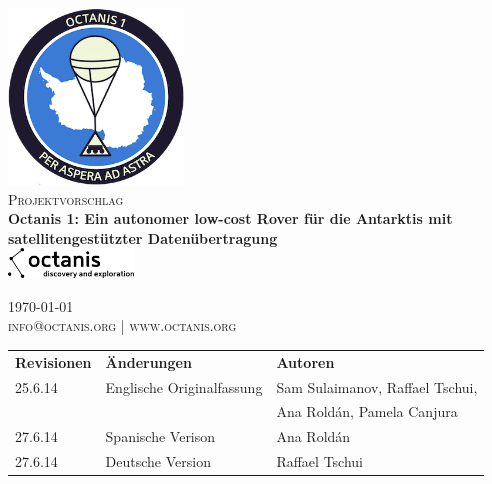 \documentclass[a4paper,12pt]{article}
\begin{document}
\begin{titlepage}
\begin{center}

\includegraphics[width=0.35\textwidth]{patch}~\\[2cm]

\textsc{\Large Projektvorschlag}\\[0.5cm]

\huge \bfseries Octanis 1: Ein autonomer low-cost Rover für die Antarktis mit satellitengestützter Datenübertragung \\[0.4cm] 

\vspace{23pt}
\includegraphics[width=0.25\textwidth]{black_logo} \\
\vfill

{\large \today} \\
\textsc{\small info@octanis.org | www.octanis.org}
\vspace{50pt}


\begin{table}[h!]
\centering
\vspace{1pt}
\begin{tabular}{ l  l  l }
	\textbf{Revisionen} & \textbf{Änderungen} & \textbf{Autoren} \\
	25.6.14 & Englische Originalfassung & Sam Sulaimanov, Raffael Tschui, \\ & & Ana Roldán, Pamela Canjura \\
	27.6.14 & Spanische Verison & Ana Roldán \\
	27.6.14 & Deutsche Version & Raffael Tschui \\
\end{tabular}
\end{table}

\end{center}
\end{titlepage}
\end{document}
